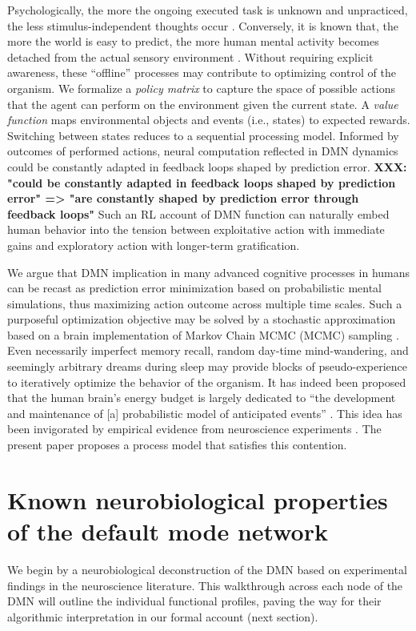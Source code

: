 \documentclass[10pt,letterpaper]{article}
\begin{document}
Psychologically,
the more the ongoing executed task is unknown and unpracticed,
the less stimulus-independent thoughts occur
\citep{filler1973daydreaming, teasdale1995stimulus, christoff2016mind}.
Conversely,
it is known that, the more the world is easy to predict,
the more human mental activity
becomes detached from the actual sensory environment
\citep{antrobus1966studies, pope1978regulation}.
Without requiring explicit awareness,
these ``offline'' processes may contribute
to optimizing control of the organism.
We formalize
a \textit{policy matrix} to capture the space of possible actions that
the agent can perform
on the environment given the current state. A \textit{value function}
maps environmental objects and events (i.e., states) to expected rewards.
Switching between states reduces to a sequential processing model.
Informed by outcomes of performed actions, neural computation reflected in
DMN dynamics could be constantly adapted in feedback loops
shaped by prediction error. \textbf{XXX: "could be constantly adapted in feedback loops shaped by prediction error" => "are constantly shaped by prediction error through feedback loops"}
Such an RL account of DMN function can naturally embed human behavior
into the tension between exploitative action with immediate gains and
exploratory action with longer-term gratification.

We argue that DMN implication in many
advanced cognitive processes in humans
can be recast as prediction error minimization
based on probabilistic mental simulations,
thus maximizing action outcome across multiple time scales.
Such a purposeful optimization objective
may be solved by a stochastic approximation
based on a brain implementation of Markov Chain MCMC (MCMC) sampling
\citep{tenenbaum2011grow}.
Even necessarily imperfect memory recall,
random day-time mind-wandering, and
seemingly arbitrary dreams during sleep
may provide blocks of pseudo-experience to iteratively
optimize the behavior of the organism.
%
It has indeed been proposed that
the human brain's energy budget is largely dedicated to
``the development and maintenance of [a]
probabilistic model of anticipated events''
\citep{raichle2005intrinsic}.
This idea has been invigorated by
empirical evidence from
neuroscience experiments \citep{kording2004bayesian, fiser2004small}.
The present paper proposes a
process model that satisfies this contention.




\section{Known neurobiological properties of the default mode network}
We begin by a neurobiological deconstruction of the DMN
based on experimental findings in the neuroscience literature.
This walkthrough across each node of the DMN will
outline the individual functional profiles,
paving the way for their algorithmic interpretation
in our formal account (next section).
\end{document}

